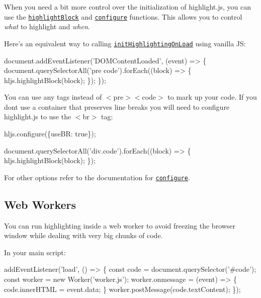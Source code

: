 When you need a bit more control over the initialization of highlight.\+js, you can use the \href{http://highlightjs.readthedocs.io/en/latest/api.html#highlightblock-block}{\tt {\ttfamily highlight\+Block}} and \href{http://highlightjs.readthedocs.io/en/latest/api.html#configure-options}{\tt {\ttfamily configure}} functions. This allows you to control {\itshape what} to highlight and {\itshape when}.

Here’s an equivalent way to calling \href{http://highlightjs.readthedocs.io/en/latest/api.html#inithighlightingonload}{\tt {\ttfamily init\+Highlighting\+On\+Load}} using vanilla JS\+:


\begin{DoxyCode}
document.addEventListener('DOMContentLoaded', (event) => \{
  document.querySelectorAll('pre code').forEach((block) => \{
    hljs.highlightBlock(block);
  \});
\});
\end{DoxyCode}


You can use any tags instead of {\ttfamily $<$pre$>$$<$code$>$} to mark up your code. If you don\textquotesingle{}t use a container that preserves line breaks you will need to configure highlight.\+js to use the {\ttfamily $<$br$>$} tag\+:


\begin{DoxyCode}
hljs.configure(\{useBR: true\});

document.querySelectorAll('div.code').forEach((block) => \{
  hljs.highlightBlock(block);
\});
\end{DoxyCode}


For other options refer to the documentation for \href{http://highlightjs.readthedocs.io/en/latest/api.html#configure-options}{\tt {\ttfamily configure}}.

\subsection*{Web Workers}

You can run highlighting inside a web worker to avoid freezing the browser window while dealing with very big chunks of code.

In your main script\+:


\begin{DoxyCode}
addEventListener('load', () => \{
  const code = document.querySelector('#code');
  const worker = new Worker('worker.js');
  worker.onmessage = (event) => \{ code.innerHTML = event.data; \}
  worker.postMessage(code.textContent);
\});
\end{DoxyCode}


